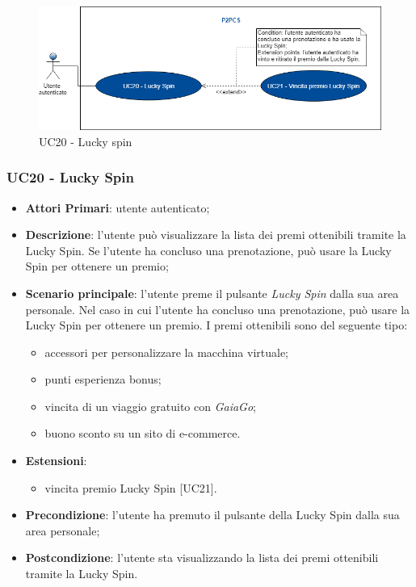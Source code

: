 \begin{figure}[h]
	\includegraphics[width=13cm]{res/images/UC20Luckyspin.png}
	\centering
	\caption{UC20 - Lucky spin}
\end{figure}
\subsubsection{UC20 - Lucky Spin}
\begin{itemize}
	\item \textbf{Attori Primari}: utente autenticato;
	\item \textbf{Descrizione}:	l'utente può visualizzare la lista dei premi ottenibili tramite la Lucky Spin\glo. Se l'utente ha concluso una prenotazione, può usare la Lucky Spin per ottenere un premio;
	\item \textbf{Scenario principale}: l'utente preme il pulsante \textit{Lucky Spin} dalla sua area personale. Nel caso in cui l'utente ha concluso una prenotazione, può usare la Lucky Spin per ottenere un premio. I premi ottenibili sono del seguente tipo:
	\begin{itemize}
		\item accessori per personalizzare la macchina virtuale;
		\item punti esperienza bonus;
		\item vincita di un viaggio gratuito con \textit{GaiaGo};
		\item buono sconto su un sito di e-commerce.	
	\end{itemize}
	\item \textbf{Estensioni}: 
	\begin{itemize}
		\item vincita premio Lucky Spin [UC21].
	\end{itemize}
	\item \textbf{Precondizione}: l'utente ha premuto il pulsante della Lucky Spin dalla sua area personale;
	\item \textbf{Postcondizione}: l'utente sta visualizzando la lista dei premi ottenibili tramite la Lucky Spin.
\end{itemize}

